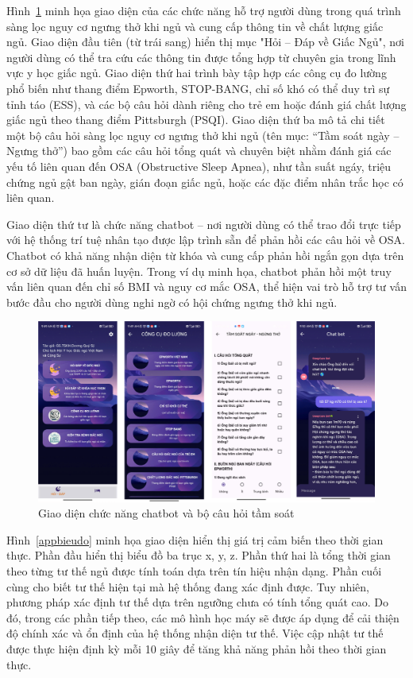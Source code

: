 Hình~\ref{appsleep} minh họa giao diện của các chức năng hỗ trợ người 
dùng trong quá trình sàng lọc nguy cơ ngưng thở khi ngủ và cung cấp 
thông tin về chất lượng giấc ngủ. Giao diện đầu tiên (từ trái sang) 
hiển thị mục "Hỏi – Đáp về Giấc Ngủ", nơi người dùng có thể tra cứu 
các thông tin được tổng hợp từ chuyên gia trong lĩnh vực y học giấc ngủ. 
Giao diện thứ hai trình bày tập hợp các công cụ đo lường phổ biến như 
thang điểm Epworth, STOP-BANG, chỉ số khó có thể duy trì sự tỉnh táo 
(ESS), và các bộ câu hỏi dành riêng cho trẻ em hoặc đánh giá chất lượng 
giấc ngủ theo thang điểm Pittsburgh (PSQI).
Giao diện thứ ba mô tả chi tiết một bộ câu hỏi sàng lọc nguy cơ ngưng 
thở khi ngủ (tên mục: “Tầm soát ngày – Ngưng thở”) bao gồm các câu hỏi 
tổng quát và chuyên biệt nhằm đánh giá các yếu tố liên quan đến OSA 
(Obstructive Sleep Apnea), như tần suất ngáy, triệu chứng ngủ gật ban 
ngày, gián đoạn giấc ngủ, hoặc các đặc điểm nhân trắc học có liên quan.

Giao diện thứ tư là chức năng chatbot – nơi người dùng có thể trao 
đổi trực tiếp với hệ thống trí tuệ nhân tạo được lập trình sẵn để 
phản hồi các câu hỏi về OSA. Chatbot có khả năng nhận diện từ khóa 
và cung cấp phản hồi ngắn gọn dựa trên cơ sở dữ liệu đã huấn luyện. 
Trong ví dụ minh họa, chatbot phản hồi một truy vấn liên quan đến chỉ 
số BMI và nguy cơ mắc OSA, thể hiện vai trò hỗ trợ tư vấn bước đầu 
cho người dùng nghi ngờ có hội chứng ngưng thở khi ngủ.



\begin{figure}[htbp]
    \centering
    \includegraphics[width=0.8\linewidth]{images/appsleep.png}
    \caption{Giao diện chức năng chatbot và bộ câu hỏi tầm soát}
    \label{appsleep}
\end{figure}



Hình~\ref{appbieudo} minh họa giao diện hiển thị giá trị 
cảm biến theo thời gian thực. Phần đầu hiển thị biểu đồ ba trục 
x, y, z. Phần thứ hai là tổng thời gian theo từng tư thế ngủ 
được tính toán dựa trên tín hiệu nhận dạng. Phần cuối cùng cho biết 
tư thế hiện tại mà hệ thống đang xác định được. 
Tuy nhiên, phương pháp xác định tư thế dựa trên ngưỡng chưa có tính tổng quát cao. 
Do đó, trong các phần tiếp theo, các mô hình học máy sẽ 
được áp dụng để cải thiện độ chính xác và ổn định của hệ 
thống nhận diện tư thế. Việc cập nhật tư thế được thực hiện 
định kỳ mỗi 10 giây để tăng khả năng phản hồi theo thời gian thực.

